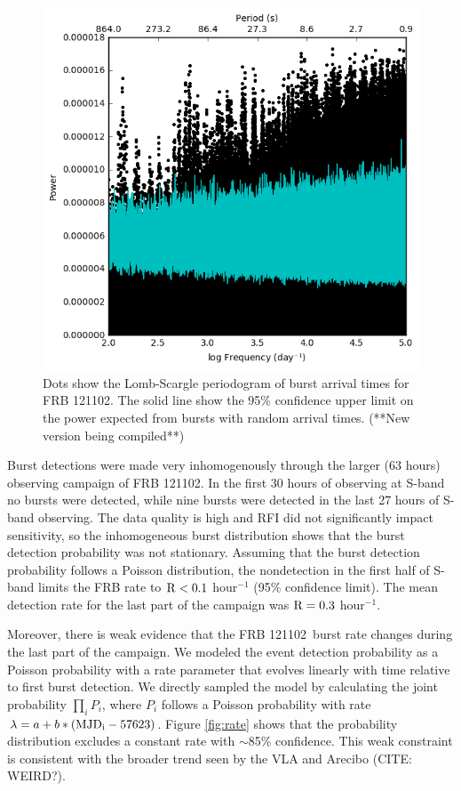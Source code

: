 \documentclass[twocolumn]{aastex61}
\newcommand{\frb}{FRB 121102}
\begin{document}
\begin{figure}[htb]
\begin{center}
\includegraphics[width=0.9\columnwidth]{lombscargle}
\caption{Dots show the Lomb-Scargle periodogram of burst arrival times for \frb. The solid line show the 95\% confidence upper limit on the power expected from bursts with random arrival times. (**New version being compiled**)
\label{fig:ls}}
\end{center}
\end{figure}

Burst detections were made very inhomogenously through the larger (63 hours) observing campaign of FRB 121102. In the first 30 hours of observing at S-band no bursts were detected, while nine bursts were detected in the last 27 hours of S-band observing. The data quality is high and RFI did not significantly impact sensitivity, so the inhomogeneous burst distribution shows that the burst detection probability was not stationary. Assuming that the burst detection probability follows a Poisson distribution, the nondetection in the first half of S-band limits the FRB rate to $\rm{R}<0.1$ hour$^{-1}$ (95\% confidence limit). The mean detection rate for the last part of the campaign was $\rm{R}=0.3$ hour$^{-1}$.

Moreover, there is weak evidence that the \frb\ burst rate changes during the last part of the campaign. We modeled the event detection probability as a Poisson probability with a rate parameter that evolves linearly with time relative to first burst detection. We directly sampled the model by calculating the joint probability $\prod_{i} P_i$, where $P_i$ follows a Poisson probability with rate $\lambda = a + b * (\rm{MJD}_i - 57623)$. Figure \ref{fig:rate} shows that the probability distribution excludes a constant rate with $\sim$85\% confidence. This weak constraint is consistent with the broader trend seen by the VLA and Arecibo (CITE: WEIRD?).
\end{document}
